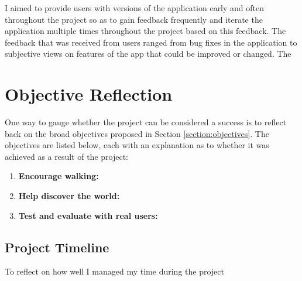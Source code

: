I aimed to provide users with versions of the application early and often throughout the project so as to gain feedback frequently and iterate the application multiple times throughout the project based on this feedback. The feedback that was received from users ranged from bug fixes in the application to subjective views on features of the app that could be improved or changed. The 

\section{Objective Reflection}


One way to gauge whether the project can be considered a success is to reflect back on the broad objectives proposed in Section \ref{section:objectives}. The objectives are listed below, each with an explanation as to whether it was achieved as a result of the project:

\begin{enumerate}[label=\textbf{Obj \arabic*}]
  \item \textbf{Encourage walking:}
  \item \textbf{Help discover the world:}
  \item \textbf{Test and evaluate with real users:}
\end{enumerate}

\subsection{Project Timeline}


To reflect on how well I managed my time during the project

